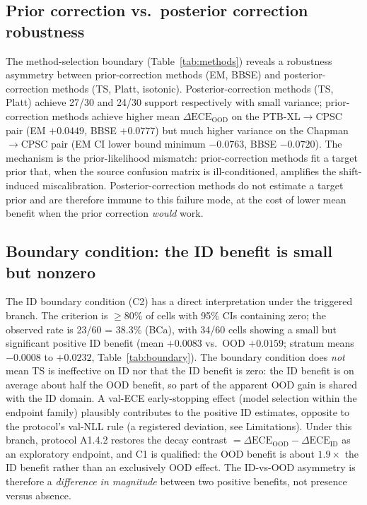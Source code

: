 \documentclass[review,12pt,nonatbib]{elsarticle}
\begin{document}
\subsection{Prior correction vs.\ posterior correction robustness}
The method-selection boundary (Table~\ref{tab:methods}) reveals a
robustness asymmetry between prior-correction methods (EM, BBSE) and
posterior-correction methods (TS, Platt, isotonic). Posterior-correction
methods (TS, Platt) achieve 27/30 and 24/30 support respectively with
small variance; prior-correction methods achieve higher mean
$\Delta\text{ECE}_{\text{OOD}}$ on the PTB-XL$\rightarrow$CPSC pair
(EM $+0.0449$, BBSE $+0.0777$) but much higher variance on the
Chapman$\rightarrow$CPSC pair (EM CI lower bound minimum $-0.0763$,
BBSE $-0.0720$). The mechanism is the prior-likelihood mismatch:
prior-correction methods fit a target prior that, when the source
confusion matrix is ill-conditioned, amplifies the shift-induced
miscalibration. Posterior-correction methods do not estimate a target
prior and are therefore immune to this failure mode, at the cost of
lower mean benefit when the prior correction \emph{would} work.

\subsection{Boundary condition: the ID benefit is small but nonzero}
The ID boundary condition (C2) has a direct interpretation under the
triggered branch. The criterion is $\geq$80\% of cells with 95\% CIs
containing zero; the observed rate is 23/60 = 38.3\% (BCa), with
34/60 cells showing a small but significant positive ID benefit
(mean $+0.0083$ vs.\ OOD $+0.0159$; stratum means $-0.0008$ to
$+0.0232$, Table~\ref{tab:boundary}). The boundary condition does
\emph{not} mean TS is ineffective on ID nor that the ID benefit is
zero: the ID benefit is on average about half the OOD benefit, so
part of the apparent OOD gain is shared with the ID domain. A val-ECE
early-stopping effect (model selection within the endpoint family)
plausibly contributes to the positive ID estimates, opposite to the
protocol's val-NLL rule (a registered deviation, see Limitations).
Under this branch, protocol A1.4.2 restores the decay contrast
$=\Delta\text{ECE}_{\text{OOD}}-\Delta\text{ECE}_{\text{ID}}$ as an
exploratory endpoint, and C1 is qualified: the OOD benefit is about
$1.9\times$ the ID benefit rather than an exclusively OOD effect. The
ID-vs-OOD asymmetry is therefore a \emph{difference in magnitude}
between two positive benefits, not presence versus absence.
\end{document}

